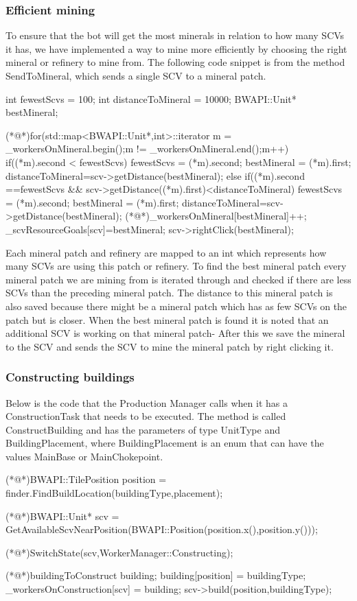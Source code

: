 		\subsubsection*{Efficient mining}
			To ensure that the bot will get the most minerals in relation to how many SCVs it has, we have implemented a way to mine more efficiently by choosing the right mineral or refinery to mine from. The following code snippet is from the method SendToMineral, which sends a single SCV
			to a mineral patch.
			
				\begin{Sourcecode}[caption=SendToMineral method]
	int fewestScvs = 100;
	int distanceToMineral = 10000;
	BWAPI::Unit* bestMineral;

	(*@\lnote@*)for(std::map<BWAPI::Unit*,int>::iterator m = _workersOnMineral.begin();m != _workersOnMineral.end();m++)
	{
		if((*m).second < fewestScvs)
		{
			fewestScvs = (*m).second;
			bestMineral = (*m).first;
			distanceToMineral=scv->getDistance(bestMineral);
		}
		else if((*m).second ==fewestScvs && scv->getDistance((*m).first)<distanceToMineral)
		{
			fewestScvs = (*m).second;
			bestMineral = (*m).first;
			distanceToMineral=scv->getDistance(bestMineral);
		}
	}
	(*@\lnote@*)_workersOnMineral[bestMineral]++;
	_scvResourceGoals[scv]=bestMineral;
	scv->rightClick(bestMineral);
				\end{Sourcecode}
			Each mineral patch and refinery are mapped to an int which represents how many SCVs are using this patch or refinery. To find the best mineral 
			patch every mineral patch we are mining from is iterated through  and checked if there are less SCVs than the preceding mineral patch. 
			The distance to this mineral patch is also saved because there might be a mineral patch which has as few SCVs on the patch but is closer. 
			When the best mineral patch is found it is noted that an additional SCV is working on that mineral patch- After this we save the 
			mineral to the SCV and sends the SCV to mine the mineral patch by right clicking it.
			
			
		\subsubsection*{Constructing buildings}
			Below is the code that the Production Manager calls when it has a ConstructionTask that needs to be executed. The method is called 
			ConstructBuilding and has the parameters of type UnitType and BuildingPlacement, where BuildingPlacement 
			is an enum that can have the values MainBase or MainChokepoint.
			\pagebreak
			\begin{Sourcecode}[caption=ConstructBuilding method]		
	(*@\lnote@*)BWAPI::TilePosition position = finder.FindBuildLocation(buildingType,placement);

	(*@\lnote@*)BWAPI::Unit* scv = GetAvailableScvNearPosition(BWAPI::Position(position.x(),position.y()));
	

	(*@\lnote@*)SwitchState(scv,WorkerManager::Constructing);
	
	(*@\lnote@*)buildingToConstruct building;	
	building[position] = buildingType;
	_workersOnConstruction[scv] = building;
	scv->build(position,buildingType);
			\end{Sourcecode}
			
